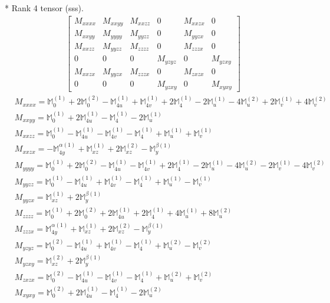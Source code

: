 \documentclass[fleqn,8pt,landscape]{jsarticle}
\begin{document}
* Rank 4 tensor (sss).
\begin{align*}
\begin{bmatrix} M_{xxxx} & M_{xxyy} & M_{xxzz} & 0 & M_{xxzx} & 0 \\ M_{xxyy} & M_{yyyy} & M_{yyzz} & 0 & M_{yyzx} & 0 \\ M_{xxzz} & M_{yyzz} & M_{zzzz} & 0 & M_{zzzx} & 0 \\ 0 & 0 & 0 & M_{yzyz} & 0 & M_{yzxy} \\ M_{xxzx} & M_{yyzx} & M_{zzzx} & 0 & M_{zxzx} & 0 \\ 0 & 0 & 0 & M_{yzxy} & 0 & M_{xyxy} \end{bmatrix}
\end{align*}
\begin{align*}
& M_{xxxx} = \mathbb{M}_{0}^{(1)} + 2 \mathbb{M}_{0}^{(2)} - \mathbb{M}_{4u}^{(1)} + \mathbb{M}_{4v}^{(1)} + 2 \mathbb{M}_{4}^{(1)} - 2 \mathbb{M}_{u}^{(1)} - 4 \mathbb{M}_{u}^{(2)} + 2 \mathbb{M}_{v}^{(1)} + 4 \mathbb{M}_{v}^{(2)} \\
& M_{xxyy} = \mathbb{M}_{0}^{(1)} + 2 \mathbb{M}_{4u}^{(1)} - \mathbb{M}_{4}^{(1)} - 2 \mathbb{M}_{u}^{(1)} \\
& M_{xxzz} = \mathbb{M}_{0}^{(1)} - \mathbb{M}_{4u}^{(1)} - \mathbb{M}_{4v}^{(1)} - \mathbb{M}_{4}^{(1)} + \mathbb{M}_{u}^{(1)} + \mathbb{M}_{v}^{(1)} \\
& M_{xxzx} = - \mathbb{M}_{4y}^{\alpha(1)} + \mathbb{M}_{xz}^{(1)} + 2 \mathbb{M}_{xz}^{(2)} - \mathbb{M}_{y}^{\beta(1)} \\
& M_{yyyy} = \mathbb{M}_{0}^{(1)} + 2 \mathbb{M}_{0}^{(2)} - \mathbb{M}_{4u}^{(1)} - \mathbb{M}_{4v}^{(1)} + 2 \mathbb{M}_{4}^{(1)} - 2 \mathbb{M}_{u}^{(1)} - 4 \mathbb{M}_{u}^{(2)} - 2 \mathbb{M}_{v}^{(1)} - 4 \mathbb{M}_{v}^{(2)} \\
& M_{yyzz} = \mathbb{M}_{0}^{(1)} - \mathbb{M}_{4u}^{(1)} + \mathbb{M}_{4v}^{(1)} - \mathbb{M}_{4}^{(1)} + \mathbb{M}_{u}^{(1)} - \mathbb{M}_{v}^{(1)} \\
& M_{yyzx} = \mathbb{M}_{xz}^{(1)} + 2 \mathbb{M}_{y}^{\beta(1)} \\
& M_{zzzz} = \mathbb{M}_{0}^{(1)} + 2 \mathbb{M}_{0}^{(2)} + 2 \mathbb{M}_{4u}^{(1)} + 2 \mathbb{M}_{4}^{(1)} + 4 \mathbb{M}_{u}^{(1)} + 8 \mathbb{M}_{u}^{(2)} \\
& M_{zzzx} = \mathbb{M}_{4y}^{\alpha(1)} + \mathbb{M}_{xz}^{(1)} + 2 \mathbb{M}_{xz}^{(2)} - \mathbb{M}_{y}^{\beta(1)} \\
& M_{yzyz} = \mathbb{M}_{0}^{(2)} - \mathbb{M}_{4u}^{(1)} + \mathbb{M}_{4v}^{(1)} - \mathbb{M}_{4}^{(1)} + \mathbb{M}_{u}^{(2)} - \mathbb{M}_{v}^{(2)} \\
& M_{yzxy} = \mathbb{M}_{xz}^{(2)} + 2 \mathbb{M}_{y}^{\beta(1)} \\
& M_{zxzx} = \mathbb{M}_{0}^{(2)} - \mathbb{M}_{4u}^{(1)} - \mathbb{M}_{4v}^{(1)} - \mathbb{M}_{4}^{(1)} + \mathbb{M}_{u}^{(2)} + \mathbb{M}_{v}^{(2)} \\
& M_{xyxy} = \mathbb{M}_{0}^{(2)} + 2 \mathbb{M}_{4u}^{(1)} - \mathbb{M}_{4}^{(1)} - 2 \mathbb{M}_{u}^{(2)}
\end{align*}
\end{document}
